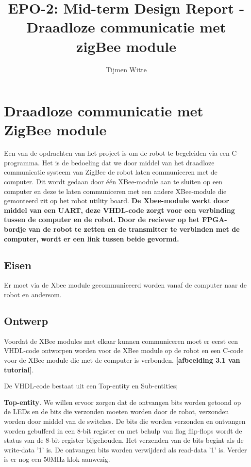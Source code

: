 \documentclass{report}
\title{EPO-2: Mid-term Design Report - Draadloze communicatie met zigBee module}
\author{Tijmen Witte}
\begin{document}
\chapter{Draadloze communicatie met ZigBee module}
\label{ch: draadloze communicatie met ZigBee module}

Een van de opdrachten van het project is om de robot te begeleiden via een C-programma.
Het is de bedoeling dat we door middel van het draadloze communicatie systeem van ZigBee de robot laten communiceren met de computer.
Dit wordt gedaan door één XBee-module aan te sluiten op een computer en deze te laten communiceren met een andere XBee-module die  gemonteerd zit op het robot utility board.
\newline
\textbf{De Xbee-module werkt door middel van een UART, deze VHDL-code zorgt voor een verbinding tussen de computer en de robot. Door de reciever op het FPGA-bordje van de robot te zetten en de transmitter te verbinden met de computer, wordt er een link tussen beide gevormd.}


\section{Eisen}

Er moet via de Xbee module gecommuniceerd worden vanaf de computer naar de robot en andersom.


\section{Ontwerp}
Voordat de XBee modules met elkaar kunnen communiceren moet er eerst een VHDL-code ontworpen worden voor de XBee module op de robot en een C-code voor de XBee module die met de computer is verbonden.
\textbf{[afbeelding 3.1 van tutorial]}.
\newline

De VHDL-code bestaat uit een Top-entity en Sub-entities;
\newline

\textbf{Top-entity}.
\newline
We willen ervoor zorgen dat de ontvangen bits worden getoond op de LEDs en de bits die verzonden moeten worden door de robot, verzonden worden door middel van de switches.
De bits die worden verzonden en ontvangen worden gebufferd in een 8-bit register en met behulp van flag flip-flops wordt de status van de 8-bit register bijgehouden.
Het verzenden van de bits begint als de write-data '1' is.
De ontvangen bits worden verwijderd als read-data '1' is.
Verder is er nog een 50MHz klok aanwezig.
\newline
\end{document}
